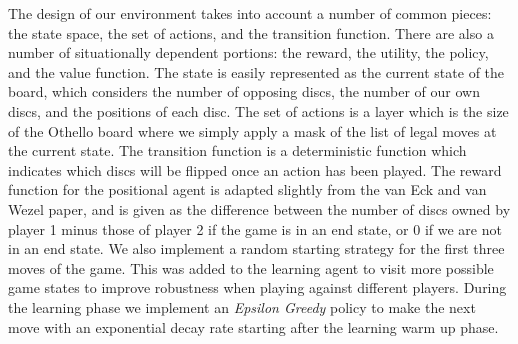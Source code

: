 \documentclass{article}
\begin{document}
The design of our environment takes into account a number of common pieces: the state space, the set of actions, and the transition function. There are also a number of situationally dependent portions: the reward, the utility, the policy, and the value function. The state is easily represented as the current state of the board, which considers the number of opposing discs, the number of our own discs, and the positions of each disc. The set of actions is a layer which is the size of the Othello board where we simply apply a mask of the list of legal moves at the current state. The transition function is a deterministic function which indicates which discs will be flipped once an action has been played. The reward function for the positional agent is adapted slightly from the van Eck and van Wezel paper, and is given as the difference between the number of discs owned by player 1 minus those of player 2 if the game is in an end state, or 0 if we are not in an end state. We also implement a random starting strategy for the first three moves of the game. This was added to the learning agent to visit more possible game states to improve robustness when playing against different players. During the learning phase we implement an \textit{Epsilon Greedy} policy to make the next move with an exponential decay rate starting after the learning warm up phase. 
\end{document}
